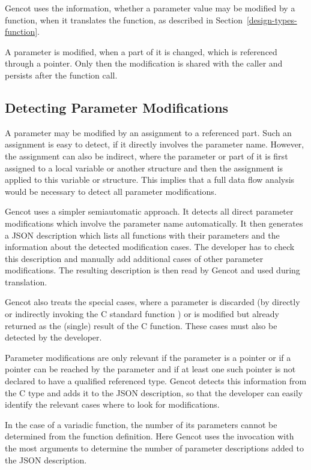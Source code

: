 Gencot uses the information, whether a parameter value may be modified by a function, when it translates
the function, as described in Section~\ref{design-types-function}.

A parameter is modified, when a part of it is changed, which is referenced through a pointer. Only then the 
modification is shared with the caller and persists after the function call.

\subsection{Detecting Parameter Modifications}

A parameter may be modified by an assignment to a referenced part. Such an assignment
is easy to detect, if it directly involves the parameter name. However, the assignment can also be indirect, where
the parameter or part of it is first assigned to a local variable or another structure and then the assignment
is applied to this variable or structure. This implies that a full data flow analysis would be necessary
to detect all parameter modifications.

Gencot uses a simpler semiautomatic approach. It detects all direct parameter modifications which involve the 
parameter name automatically. It then generates a JSON description which lists all functions with their parameters
and the information about the detected modification cases. The developer has to check this description and
manually add additional cases of other parameter modifications. The resulting description is then read by
Gencot and used during translation.

Gencot also treats the special cases, where a parameter is discarded (by directly or indirectly invoking the C standard
function ) or is modified but already returned as the (single) result of the C function. These cases 
must also be detected by the developer.

Parameter modifications are only relevant if the parameter is a pointer or if a pointer can be reached by the parameter
and if at least one such pointer is not declared to have a  qualified referenced type. Gencot detects
this information from the C type and adds it to the JSON description, so that the developer can easily identify
the relevant cases where to look for modifications.

In the case of a variadic function, the number of its parameters cannot be determined from the function definition.
Here Gencot uses the invocation with the most arguments to determine the number of parameter descriptions added
to the JSON description.


